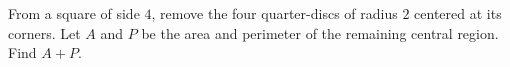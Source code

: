 From a square of side $4$, remove the four quarter-discs of radius $2$ centered at its corners. Let $A$ and $P$ be the area and perimeter of the remaining central region. Find $A+P$.
